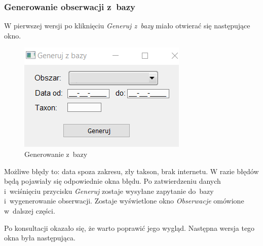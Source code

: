 \documentclass{article}
\begin{document}
\newpage
\subsubsection{Generowanie obserwacji z~bazy}
W pierwszej wersji po kliknięciu \textit{Generuj z~bazy} miało otwierać się następujące okno. 

\begin{figure}[h] 
\begin{center}
\includegraphics[scale = 1]{"generujzbazy.png"}
\end{center}
\caption{Generowanie z~bazy}
\label{}
\end{figure}

Możliwe błędy to: data spoza zakresu, zły takson, brak internetu. W razie błędów będą pojawiały się odpowiednie okna błędu. Po zatwierdzeniu danych i~wciśnięciu przycisku \textit{Generuj} zostaje wysyłane zapytanie do~bazy i~wygenerowanie obserwacji. Zostaje wyświetlone okno \textit{Obserwacje} omówione w~dalszej części. 

Po konsultacji okazało się, że warto poprawić jego wygląd. Następna wersja tego okna była następująca.
\end{document}
